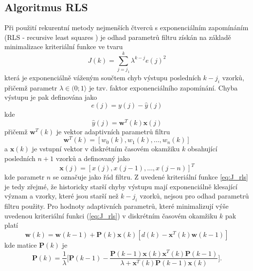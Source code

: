 \subsection{Algoritmus RLS}\label{chap:rls}
Při použití rekurentní metody nejmenších čtverců s exponenciálním zapomínáním  (RLS - recursive least squares \cite{haykin}) je odhad parametrů filtru získán na základě minimalizace kriteriální funkce ve tvaru
\begin{equation}\label{eq:J_rls}
    J(k)=\sum_{j=j_1}^k \lambda^{k-j} e(j)^2
\end{equation}
která je exponenciálně váženým součtem chyb výstupu posledních $k-j_i$ vzorků, přičemž parametr $\lambda \in (0;1\rangle$ je tzv. faktor exponenciálního zapomínání. Chyba výstupu je pak definována jako
\begin{equation}
    e(j)=y(j)-\hat{y}(j)
\end{equation}
kde
\begin{equation}
    \hat{y}(j)=\textbf{w}^T(k)\textbf{x}(j)
\end{equation}
přičemž $\textbf{w}^T(k)$ je vektor adaptivních parametrů filtru
\begin{equation}
    \textbf{w}^T(k)=[w_0(k),w_1(k),\dots,w_n(k)]
\end{equation}
a $\textbf{x}(k)$ je vstupní vektor v diskrétním časovém okamžiku $k$ obsahující posledních $n+1$ vzorků a definovaný jako
\begin{equation}
    \textbf{x}(j)=[x(j), x(j-1), \dots, x(j-n)]^T
\end{equation}
kde parametr $n$ se označuje jako řád filtru. Z uvedené kriteriální funkce \ref{eq:J_rls} je tedy zřejmé, že historicky starší chyby výstupu mají exponenciálně klesající význam a vzorky, které jsou starší než $k-j_i$ vzorků, nejsou pro odhad parametrů filtru použity.  Pro hodnoty adaptivních parametrů, které minimalizují výše uvedenou kriteriální funkci (\ref{eq:J_rls}) v diskrétním časovém okamžiku $k$ pak platí
\begin{equation}\label{eq:rls_update}
    \textbf{w}(k)=\textbf{w}(k-1)+\textbf{P}(k)\textbf{x}(k)[d(k)-\textbf{x}^T(k)\textbf{w}(k-1)]
\end{equation}
kde matice $\textbf{P}(k)$ je 
\begin{equation}
\textbf{P}(k)=\frac{1}{\lambda}\Bigg[\textbf{P}(k-1)- \frac{\textbf{P}(k-1)\textbf{x}(k)\textbf{x}^T(k)\textbf{P}(k-1)}{\lambda+\textbf{x}^T(k)\textbf{P}(k-1)\textbf{x}(k)}\Bigg].
\end{equation}

